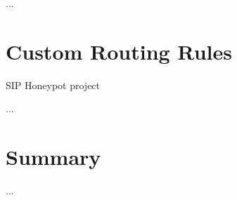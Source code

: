 ...


\section{Custom Routing Rules}
\label{sec:Custom-Routing-Rules}

SIP Honeypot project~\cite{IFIPNetworking2014}

...



\section{Summary}

...
